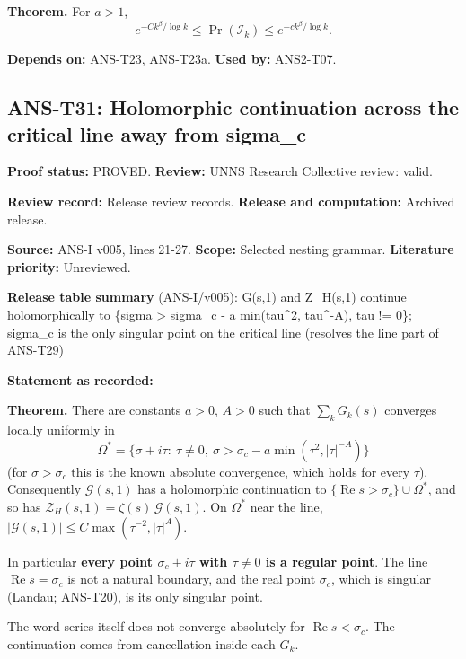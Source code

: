 \documentclass[
  11pt,
]{article}
\begin{document}
\textbf{Theorem.} For \(a>1\),
\[e^{-Ck^{\beta}/\log k}\le\Pr(\mathcal I_k)\le e^{-ck^{\beta}/\log k}.\]

\textbf{Depends on:} ANS-T23, ANS-T23a. \textbf{Used by:} ANS2-T07.

\hypertarget{ans-t31-holomorphic-continuation-across-the-critical-line-away-from-sigma_c}{%
\subsection{ANS-T31: Holomorphic continuation across the critical line
away from
sigma\_c}\label{ans-t31-holomorphic-continuation-across-the-critical-line-away-from-sigma_c}}

\textbf{Proof status:} PROVED. \textbf{Review:} UNNS Research Collective
review: valid.

\textbf{Review record:} Release review records. \textbf{Release and
computation:} Archived release.

\textbf{Source:} ANS-I v005, lines 21-27. \textbf{Scope:} Selected
nesting grammar. \textbf{Literature priority:} Unreviewed.

\textbf{Release table summary} (ANS-I/v005): G(s,1) and Z\_H(s,1)
continue holomorphically to \{sigma \textgreater{} sigma\_c - a
min(tau\^{}2, \textbar tau\textbar\^{}-A), tau != 0\}; sigma\_c is the
only singular point on the critical line (resolves the line part of
ANS-T29)

\textbf{Statement as recorded:}

\textbf{Theorem.} There are constants \(a>0\), \(A>0\) such that
\(\sum_kG_k(s)\) converges locally uniformly in
\[\Omega^*=\{\sigma+i\tau:\ \tau\ne0,\ \sigma>\sigma_c-a\min(\tau^2,|\tau|^{-A})\}\]
(for \(\sigma>\sigma_c\) this is the known absolute convergence, which
holds for every \(\tau\)). Consequently \(\mathcal G(s,1)\) has a
holomorphic continuation to
\(\{\operatorname{Re}s>\sigma_c\}\cup\Omega^*\), and so has
\(\mathcal Z_H(s,1)=\zeta(s)\,\mathcal G(s,1)\). On \(\Omega^*\) near
the line, \(|\mathcal G(s,1)|\le C\max(\tau^{-2},|\tau|^{A})\).

In particular \textbf{every point \(\sigma_c+i\tau\) with \(\tau\ne0\)
is a regular point}. The line \(\operatorname{Re}s=\sigma_c\) is not a
natural boundary, and the real point \(\sigma_c\), which is singular
(Landau; ANS-T20), is its only singular point.

The word series itself does not converge absolutely for
\(\operatorname{Re}s<\sigma_c\). The continuation comes from
cancellation inside each \(G_k\).
\end{document}
